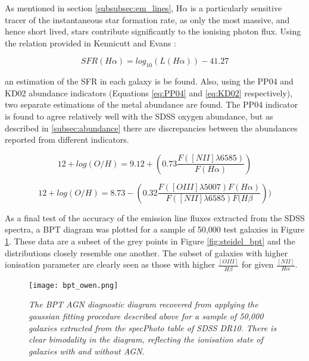 \documentclass{literature}
\begin{document}
As mentioned in section \ref{subsubsec:em_lines}, H$\alpha$ is a particularly sensitive tracer of the instantaneous star formation rate, as only the most massive, and hence short lived, stars contribute significantly to the ionising photon flux. Using the relation provided in Kennicutt and Evans \citep{Kennicutt_2012}: 

\begin{equation}
 	\label{eq:halpha_sfr}
 	SFR(H\alpha) = log_{10}(L(H\alpha)) - 41.27
 \end{equation} 

an estimation of the SFR in each galaxy is be found. Also, using the PP04 \citep{Pettini_2004} and KD02 \citep{Kewley2002} abundance indicators (Equations \ref{eq:PP04} and \ref{eq:KD02} respectively), two separate estimations of the metal abundance are found. The PP04 indicator is found to agree relatively well with the SDSS oxygen abundance, but as described in \ref{subsec:abundance} there are discrepancies between the abundances reported from different indicators.  

\begin{equation}
	\label{eq:PP04}
	12 + log(O/H) = 9.12 + (0.73\frac{F([NII]\lambda 6585)}{F(H\alpha)})
\end{equation}

\begin{equation}
	\label{eq:KD02}
	12 + log(O/H) = 8.73 - (0.32\frac{F([OIII]\lambda 5007)F(H\alpha)}{F([NII]\lambda 6585)F(H\beta}))	
\end{equation}

As a final test of the accuracy of the emission line fluxes extracted from the SDSS spectra, a BPT diagram was plotted for a sample of 50,000 test galaxies in Figure \ref{fig:owen_bpt}. These data are a subset of the grey points in Figure \ref{fig:steidel_bpt} and the distributions closely resemble one another. The subset of galaxies with higher ionisation parameter are clearly seen as those with higher $\frac{[OIII]}{H\beta}$ for given $\frac{[NII]}{H\alpha}$.


\begin{figure}[!htp]
\centering
\texttt{[image: bpt\_owen.png]}
\caption{\footnotesize{\emph{The BPT AGN diagnostic diagram recovered from applying the gaussian fitting procedure described above for a sample of 50,000 galaxies extracted from the specPhoto table of SDSS DR10. There is clear bimodality in the diagram, reflecting the ionisation state of galaxies with and without AGN.}}}
\label{fig:owen_bpt}
\end{figure}    
\end{document}
